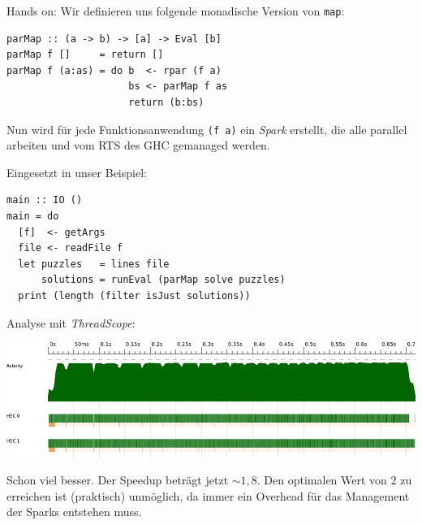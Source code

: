 \documentclass{beamer}
\begin{document}
\begin{frame}[fragile]
Hands on: Wir definieren uns folgende monadische Version von \texttt{map}:\pause

\begin{verbatim}
parMap :: (a -> b) -> [a] -> Eval [b]
parMap f []     = return []
parMap f (a:as) = do b  <- rpar (f a)
                     bs <- parMap f as
                     return (b:bs)
\end{verbatim}

Nun wird für jede Funktionsanwendung \texttt{(f a)} ein \emph{Spark} erstellt, die alle parallel arbeiten und vom RTS des GHC gemanaged werden.

\pause
Eingesetzt in unser Beispiel:

\begin{verbatim}
main :: IO ()
main = do
  [f]  <- getArgs
  file <- readFile f
  let puzzles   = lines file
      solutions = runEval (parMap solve puzzles)
  print (length (filter isJust solutions))
\end{verbatim}

\end{frame}


\begin{frame}

Analyse mit \emph{ThreadScope}:\smallskip

\begin{center}
\includegraphics[scale=0.7]{threadscope2.png}
\end{center}
\bigskip

Schon viel besser. Der Speedup beträgt jetzt $\sim 1,8$. Den optimalen Wert von $2$ zu erreichen ist (praktisch) unmöglich, da immer ein Overhead für das Management der Sparks entstehen muss.

\end{frame}

\end{document}
